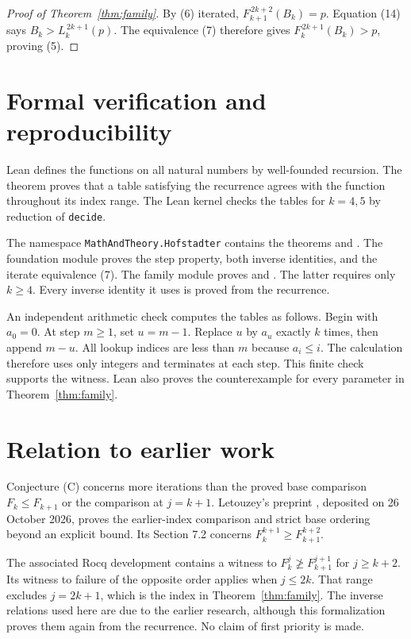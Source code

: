 \documentclass[11pt,a4paper]{article}
\newcommand{\itf}[2]{F_{#1}^{\,#2}}
\newcommand{\itl}[2]{L_{#1}^{\,#2}}
\begin{document}
\begin{proof}[Proof of Theorem~\ref{thm:family}]
By (6) iterated,
\(\itf{k+1}{2k+2}(B_k)=p\). Equation (14) says
\(B_k>\itl{k}{2k+1}(p)\). The equivalence (7) therefore gives
\(\itf{k}{2k+1}(B_k)>p\), proving (5).
\end{proof}


\section{Formal verification and reproducibility}\label{sec:formal}
Lean defines the functions on all natural numbers by well-founded recursion.
The theorem  proves that a table satisfying the
recurrence agrees with the function throughout its index range.
The Lean kernel checks the tables for $k=4,5$ by reduction of \texttt{decide}.

The namespace \texttt{MathAndTheory.Hofstadter} contains the theorems
 and .
The foundation module proves the step property, both inverse identities,
and the iterate equivalence (7). The family module proves
 and .
The latter requires only $k\geq4$. Every inverse identity it uses is proved
from the recurrence.

An independent arithmetic check computes the tables as follows.
Begin with $a_0=0$. At step $m\geq1$, set $u=m-1$.
Replace $u$ by $a_u$ exactly $k$ times, then append $m-u$.
All lookup indices are less than $m$ because $a_i\leq i$.
The calculation therefore uses only integers and terminates at each step.
This finite check supports the witness. Lean also proves the counterexample
for every parameter in Theorem~\ref{thm:family}.

\section{Relation to earlier work}\label{sec:prior}
Conjecture (C) concerns more iterations than the proved base comparison
$F_k\leq F_{k+1}$ or the comparison at $j=k+1$.
Letouzey's preprint \cite{new}, deposited on 26 October 2026, proves the
earlier-index comparison and strict base ordering beyond an explicit bound.
Its Section 7.2 concerns $F_k^{k+1}\geq F_{k+1}^{k+2}$.

The associated Rocq development \cite{repo} contains a witness to
$F_k^j\not\geq F_{k+1}^{j+1}$ for $j\geq k+2$.
Its witness to failure of the opposite order applies when $j\leq2k$.
That range excludes $j=2k+1$, which is the index in Theorem~\ref{thm:family}.
The inverse relations used here are due to the earlier research,
although this formalization proves them again from the recurrence.
No claim of first priority is made.
\end{document}

